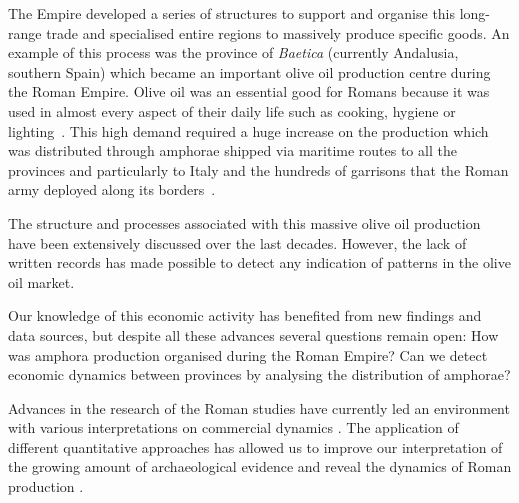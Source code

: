 \documentclass[review]{elsarticle}
\newcommand{\memo}[2]{\textcolor{#1}{#2}}
\newcommand{\xavi}[1]{\memo{magenta}{XRC: #1\\}}
\begin{document}
The Empire developed a series of structures to support and organise this long-range trade and specialised entire regions to massively produce specific goods. An example of this process was the province of \textit{Baetica} (currently Andalusia, southern Spain) which became an important olive oil production centre during the Roman Empire. Olive oil was an essential good for Romans because it was used in almost every aspect of their daily life such as cooking, hygiene or lighting~\citep{mattingly_d.j._oil_1988}. This high demand required a huge increase on the production which was distributed through amphorae shipped via maritime routes to all the provinces and particularly to Italy and the hundreds of garrisons that the Roman army deployed along its borders~\citep{blazquez_exportacion_1980}. 

The structure and processes associated with this massive olive oil production have been extensively discussed over the last decades\citep{rodriguez_economioleicola_1977, Chic_hispania_1997,millet_anforas_1998}. 
However, the lack of written records has made possible to detect any indication of patterns in the olive oil market.

Our knowledge of this economic activity has benefited from new findings and data sources, but despite all these advances several questions remain open: How was amphora production organised during the Roman Empire? Can we detect economic dynamics between provinces by analysing the distribution of amphorae?





Advances in the research of the Roman studies have currently led an environment with various interpretations on commercial dynamics \citep{duncan1982economy,
temin_economy_2006,
quantifyingwilson2009}.
The application of different quantitative approaches has allowed us to improve our interpretation of the growing amount of archaeological evidence and reveal the dynamics of Roman production %
\citep{brughmans_roman_2016,
orengo_seeds_2016,bayesian_2018,
coto-sarmiento_identifying_2018,
rubio-campillo_ecology_2018}.
\end{document}
